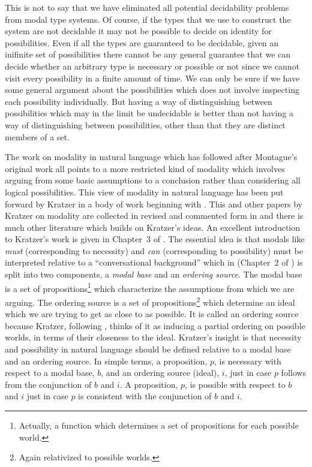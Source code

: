 This is not to say that we have eliminated all potential decidability
problems from modal type systems.  Of course, if the types that we use
to construct the system are not decidable it may not be possible to
decide on identity for possibilities.  Even if all the types are
guaranteed to be decidable, given an inifinite
set of possibilities there cannot be any general guarantee that we can
decide whether an arbitrary type is necessary or possible or not since
we cannot visit every possibility in a finite amount of time.  We can
only be sure if we have some general argument about the
possibilities which does not involve inspecting each possibility
individually.  But having a way of distinguishing between
possibilities which may in the limit be undecidable is better than not
having a way of distinguishing between possibilities, other than that
they are distinct members of a set.

The work on modality in natural language which has followed after
Montague's original work all points to a more restricted kind of
modality which involves arguing from some basic assumptions to a
conclusion rather than considering all logical possibilities.  This
view of modality in natural language has been put forward by Kratzer
in a body of work beginning with \cite{Kratzer1977}.  This and other
papers by Kratzer on modality are collected in revised and commented
form in \cite{Kratzer2012} and there is much other literature which
builds on Kratzer's ideas.  An excellent introduction to Kratzer's
work is given in Chapter~3 of \cite{Portner2009}.  The essential idea is that modals like
\textit{must} (corresponding to necessity) and \textit{can}
(corresponding to possibility) must be interpreted relative to a
``conversational background'' which in \cite{Kratzer1981} (Chapter~2
of \citealp{Kratzer2012}) is split into two components, a \textit{modal base} and an
\textit{ordering source}. The modal base is a set of
propositions\footnote{Actually, a function which determines a set of
  propositions for each possible world.} which characterize the
assumptions from which we are arguing. The ordering source is a set of
propositions\footnote{Again relativized to possible worlds.} which determine an ideal which we are trying to get as
close to as possible.  It is called an ordering source because
Kratzer, following \cite{Lewis1981}, thinks of it as inducing a
partial ordering on possible worlds, in terms of their closeness to
the ideal. Kratzer's insight is that necessity and possibility in
natural language should be defined relative to a modal base and an
ordering source.  In simple terms, a proposition, $p$, is necessary with
respect to a modal base, $b$, and an ordering source (ideal), $i$,
just in case $p$
follows from the conjunction of $b$ and $i$.  A proposition, $p$, is
possible with respect to $b$ and $i$ just in case $p$ is consistent
with the conjunction of $b$ and $i$.

